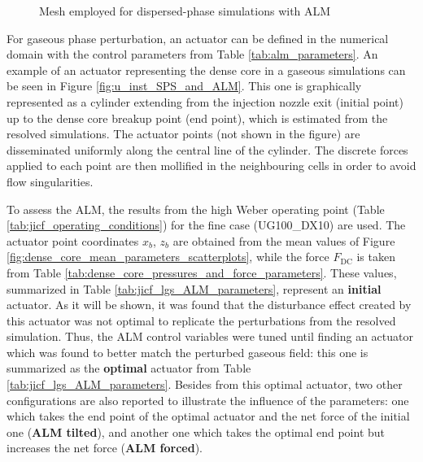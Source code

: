 \begin{figure}[h!]
	\centering
	\caption{Mesh employed for dispersed-phase simulations with ALM}
	\label{fig:jicf_dlr_mesh_LGS}
\end{figure}


For gaseous phase perturbation, an actuator can be defined in the numerical domain with the control parameters from Table \ref{tab:alm_parameters}. An example of an actuator representing the dense core in a gaseous simulations can be seen in Figure \ref{fig:u_inst_SPS_and_ALM}. This one is graphically represented as a cylinder extending from the injection nozzle exit (initial point) up to the dense core breakup point (end point), which is estimated from the resolved simulations. The actuator points (not shown in the figure) are disseminated uniformly along the central line of the cylinder. The discrete forces applied to each point are then mollified in the neighbouring cells in order to avoid flow singularities. 



To assess the ALM, the results from the high Weber operating point (Table \ref{tab:jicf_operating_conditions}) for the fine case (UG100\_DX10) are used. The actuator point coordinates $x_b$, $z_b$ are obtained from the mean values of Figure \ref{fig:dense_core_mean_parameters_scatterplots}, while the force $F_\mathrm{DC}$ is taken from Table \ref{tab:dense_core_pressures_and_force_parameters}. These values, summarized in Table \ref{tab:jicf_lgs_ALM_parameters}, represent an \textbf{initial} actuator. As it will be shown, it was found that the disturbance effect created by this actuator was not optimal to replicate the perturbations from the resolved simulation. Thus, the ALM control variables were tuned until finding an actuator which was found to better match the perturbed gaseous field: this one is summarized as the \textbf{optimal} actuator from Table \ref{tab:jicf_lgs_ALM_parameters}. Besides from this optimal actuator, two other configurations are also reported to illustrate the influence of the parameters: one which takes the end point of the optimal actuator and the net force of the initial one (\textbf{ALM tilted}), and another one which takes the optimal end point but increases the net force (\textbf{ALM forced}). 

